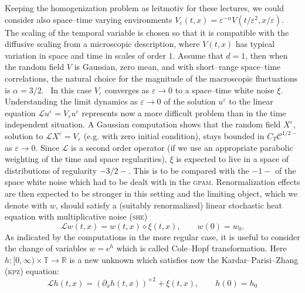 \documentclass[a4paper,11pt]{article}
\newcommand{\tmname}[1]{\textsc{#1}}
\newcommand{\LL}{\mathscr{L}}
\newcommand{\CC}{\mathscr{C}}
\newcommand{\renorm}{\,\mathord{\diamond}\,}
\begin{document}
Keeping the homogenization problem as leitmotiv for these lectures, we could
consider also space--time varying environments $V_{\varepsilon} (t, x) =
\varepsilon^{- \alpha} V (t / \varepsilon^2, x / \varepsilon)$. The scaling of
the temporal variable is chosen so that it is compatible with the diffusive
scaling from a microscopic description, where $V (t, x)$ has typical variation
in space and time in scales of order $1$. Assume that $d = 1$, then when the
random field $V$ is Gaussian, zero mean, and with short--range space--time
correlations, the natural choice for the magnitude of the macroscopic
fluctuations is $\alpha = 3 / 2$. \ In this case $V_{\varepsilon}$ converges
as $\varepsilon \rightarrow 0$ to a space--time white noise $\xi$.
Understanding the limit dynamics as $\varepsilon \rightarrow 0$ of the
solution $u^{\varepsilon}$ to the linear equation $\LL u^{\varepsilon} =
V_{\varepsilon} u^{\varepsilon}$ represents now a more difficult problem than
in the time independent situation. A Gaussian computation shows that the
random field $X^{\varepsilon}$, solution to $\LL X^{\varepsilon} =
V_{\varepsilon}$ (e.g. with zero initial condition), stays bounded in $C_T
\CC^{1 / 2 -}$ as $\varepsilon \rightarrow 0$. Since $\LL$ is a second order
operator (if we use an appropriate parabolic weighting of the time and space
regularities), $\xi$ is expected to live in a space of distributions of
regularity $- 3 / 2 -$. This is to be compared with the $- 1 -$ of the space
white noise which had to be dealt with in the {\tmname{gpam}}. Renormalization
effects are then expected to be stronger in this setting and the limiting
object, which we denote with $w$, should satisfy a (suitably renormalized)
linear stochastic heat equation with multiplicative noise ({\tmname{she}})
\begin{equation}
  \label{eq:heat-intro} \LL w (t, x) = w (t, x) \renorm \xi (t, x),
  \hspace{2em} w (0) = w_0 .
\end{equation}
As indicated by the computations in the more regular case, it is useful to
consider the change of variables $w = e^h$ which is called Cole--Hopf
transformation. Here $h : [0, \infty) \times \mathbb{T} \rightarrow
\mathbb{R}$ is a new unknown which satisfies now the Kardar--Parisi--Zhang
({\tmname{kpz}}) equation:
\begin{equation}
  \label{eq:kpz-intro} \LL h (t, x) = (\partial_x h (t, x))^{\renorm 2} + \xi
  (t, x), \hspace{2em} h (0) = h_0
\end{equation}
\end{document}
